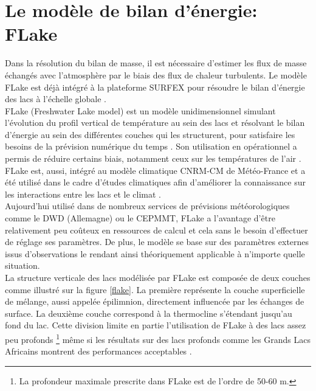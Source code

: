 \section{{\selectfont Le modèle de bilan d'énergie: FLake}}
\label{sec:FLake}
Dans la résolution du bilan de masse, il est nécessaire d'estimer les flux de masse échangés avec l'atmosphère par le biais des flux de chaleur turbulents. Le modèle FLake est déjà intégré à la plateforme SURFEX pour résoudre le bilan d'énergie des lacs à l'échelle globale \citep{salgado2010}.\\
FLake (Freshwater Lake model) est un modèle unidimensionnel simulant l'évolution du profil vertical de température au sein des lacs et résolvant le bilan d'énergie au sein des différentes couches qui les structurent, pour satisfaire les besoins de la prévision numérique du temps \citep{mironov2008, mironov2010}. Son utilisation en opérationnel a permis de réduire certains biais, notamment ceux sur les températures de l'air \citep{balsamo2012}. FLake est, aussi, intégré au modèle climatique CNRM-CM de Météo-France \citep{voldoire2019} et a été utilisé dans le cadre d'études climatiques afin d'améliorer la connaissance sur les interactions entre les lacs et le climat \citep{samuelsson2010, lemoigne2013,lemoigne2016}.\\

Aujourd'hui utilisé dans de nombreux services de prévisions météorologiques comme le DWD (Allemagne) ou le CEPMMT, FLake a l'avantage d'être relativement peu coûteux en ressources de calcul et cela sans le besoin d'effectuer de réglage ses paramètres. De plus, le modèle se base sur des paramètres externes issus d'observations le rendant ainsi théoriquement applicable à n'importe quelle situation.\\
\clearpage
La structure verticale des lacs modélisée par FLake est composée de deux couches comme illustré sur la figure \ref{flake}. La première représente la couche superficielle de mélange, aussi appelée épilimnion, directement influencée par les échanges de surface. La deuxième couche correspond à la thermocline s'étendant jusqu'au fond du lac. Cette division limite en partie l'utilisation de FLake à des lacs assez peu profonds \footnote{La profondeur maximale prescrite dans FLake est de l'ordre de 50-60 m.} \citep[]{lemoigne2016} même si les résultats sur des lacs profonds comme les Grands Lacs Africains montrent des performances acceptables \citep{thiery2015}.\\

